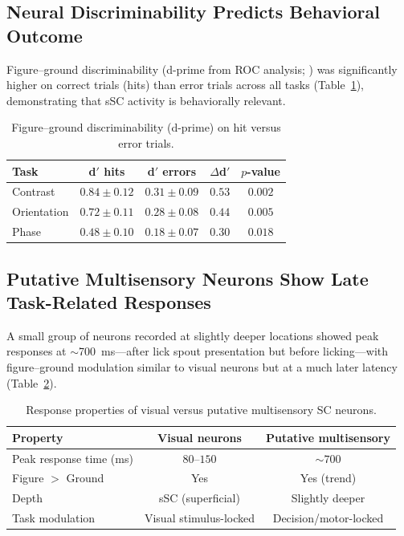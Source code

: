 \documentclass[11pt]{article}
\begin{document}
\subsection{Neural Discriminability Predicts Behavioral Outcome}

Figure--ground discriminability (d-prime from ROC analysis; \citealt{green1966signal}) was significantly higher on correct trials (hits) than error trials across all tasks (Table~\ref{tab:dprime}), demonstrating that sSC activity is behaviorally relevant.

\begin{table}[H]
\centering
\caption{Figure--ground discriminability (d-prime) on hit versus error trials.}
\label{tab:dprime}
\begin{tabular}{lcccc}
\toprule
\textbf{Task} & \textbf{d$'$ hits} & \textbf{d$'$ errors} & \textbf{$\Delta$d$'$} & \textbf{$p$-value} \\
\midrule
Contrast & $0.84 \pm 0.12$ & $0.31 \pm 0.09$ & $0.53$ & $0.002$ \\
Orientation & $0.72 \pm 0.11$ & $0.28 \pm 0.08$ & $0.44$ & $0.005$ \\
Phase & $0.48 \pm 0.10$ & $0.18 \pm 0.07$ & $0.30$ & $0.018$ \\
\bottomrule
\end{tabular}
\end{table}

\subsection{Putative Multisensory Neurons Show Late Task-Related Responses}

A small group of neurons recorded at slightly deeper locations showed peak responses at ${\sim}$700~ms---after lick spout presentation but before licking---with figure--ground modulation similar to visual neurons but at a much later latency (Table~\ref{tab:multisensory}).

\begin{table}[H]
\centering
\caption{Response properties of visual versus putative multisensory SC neurons.}
\label{tab:multisensory}
\begin{tabular}{lcc}
\toprule
\textbf{Property} & \textbf{Visual neurons} & \textbf{Putative multisensory} \\
\midrule
Peak response time (ms) & $80$--$150$ & ${\sim}700$ \\
Figure $>$ Ground & Yes & Yes (trend) \\
Depth & sSC (superficial) & Slightly deeper \\
Task modulation & Visual stimulus-locked & Decision/motor-locked \\
\bottomrule
\end{tabular}
\end{table}
\end{document}
